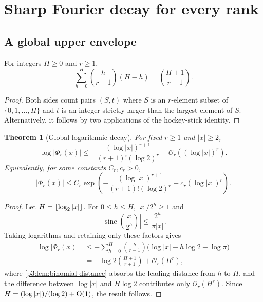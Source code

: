 \documentclass[11pt,oneside]{article}
\newtheorem{theorem}{Theorem}[section]
\theoremstyle{definition}
\theoremstyle{remark}
\newcommand{\sinc}{\operatorname{sinc}}
\newcommand{\bigO}{\mathcal O}
\begin{document}
\section{Sharp Fourier decay for every rank}\label{p3:sec:fourier}

\subsection{A global upper envelope}

\begin{lemma}\label{p3:lem:binomial-distance}
For integers $H\ge0$ and $r\ge1$,
\begin{equation}\label{p3:eq:binomial-distance}
 \sum_{h=0}^{H}\binom h{r-1}(H-h)=\binom{H+1}{r+1}.
\end{equation}
\end{lemma}

\begin{proof}
Both sides count pairs $(S,t)$ where $S$ is an $r$-element subset of
$\{0,1,\ldots,H\}$ and $t$ is an integer strictly larger than the largest element of $S$.  Alternatively, it follows by two applications of the hockey-stick identity.
\end{proof}

\begin{theorem}[Global logarithmic decay]\label{p3:thm:global-fourier-decay}
For fixed $r\ge1$ and $|x|\ge2$,
\begin{equation}\label{p3:eq:global-fourier-decay}
 \log|\Phi_r(x)|
 \le -\frac{(\log|x|)^{r+1}}
 {(r+1)!(\log2)^r}
 +\bigO_r((\log|x|)^r).
\end{equation}
Equivalently, for some constants $C_r,c_r>0$,
\begin{equation}\label{p3:eq:global-fourier-exp}
 |\Phi_r(x)|
 \le C_r\exp\!\left(
 -\frac{(\log|x|)^{r+1}}
 {(r+1)!(\log2)^r}
 +c_r(\log|x|)^r\right).
\end{equation}
\end{theorem}

\begin{proof}
Let $H=\left\lfloor \log_2|x|\right\rfloor$.  For $0\le h\le H$,
$|x|/2^h\ge1$ and
\[
 \left|\sinc\!\left(\frac x{2^h}\right)\right|
 \le\frac{2^h}{\pi|x|}.
\]
Taking logarithms and retaining only these factors gives
\begin{align*}
 \log|\Phi_r(x)|
 &\le -\sum_{h=0}^{H}\binom h{r-1}
   \bigl(\log|x|-h\log2+\log\pi\bigr)\\
 &=-\log2\binom{H+1}{r+1}+\bigO_r(H^r),
\end{align*}
where \cref{p3:lem:binomial-distance} absorbs the leading distance from $h$ to $H$, and the difference between $\log|x|$ and $H\log2$ contributes only $\bigO_r(H^r)$.  Since $H=(\log|x|)/(\log2)+\mathrm O(1)$, the result follows.
\end{proof}
\end{document}
